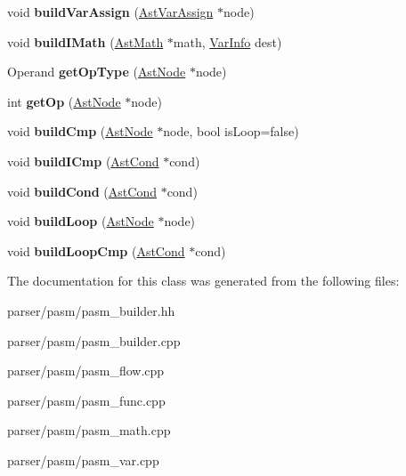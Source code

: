 \begin{DoxyCompactItemize}
\item 
\mbox{\label{classPasmBuilder_af85a036d1002cc982d8f5f9110874723}} 
void {\bfseries build\+Var\+Assign} (\hyperlink{classAstVarAssign}{Ast\+Var\+Assign} $\ast$node)
\item 
\mbox{\label{classPasmBuilder_a3f5427d54f868e12b599144322ceda54}} 
void {\bfseries build\+I\+Math} (\hyperlink{classAstMath}{Ast\+Math} $\ast$math, \hyperlink{structVarInfo}{Var\+Info} dest)
\item 
\mbox{\label{classPasmBuilder_acce80b42508ef12b964707da5a8e42f6}} 
Operand {\bfseries get\+Op\+Type} (\hyperlink{classAstNode}{Ast\+Node} $\ast$node)
\item 
\mbox{\label{classPasmBuilder_a7c14456727bec33c7830a00ca793c7cc}} 
int {\bfseries get\+Op} (\hyperlink{classAstNode}{Ast\+Node} $\ast$node)
\item 
\mbox{\label{classPasmBuilder_a7b7f3988c46f708dace0c9891b80f1c0}} 
void {\bfseries build\+Cmp} (\hyperlink{classAstNode}{Ast\+Node} $\ast$node, bool is\+Loop=false)
\item 
\mbox{\label{classPasmBuilder_a4ad6d08a9fd145020e8efe1f7623bc03}} 
void {\bfseries build\+I\+Cmp} (\hyperlink{classAstCond}{Ast\+Cond} $\ast$cond)
\item 
\mbox{\label{classPasmBuilder_a59d20a39e0eaa7581981830518ce1ad4}} 
void {\bfseries build\+Cond} (\hyperlink{classAstCond}{Ast\+Cond} $\ast$cond)
\item 
\mbox{\label{classPasmBuilder_a8f2ddcf13b863b48aaf3e604990b6705}} 
void {\bfseries build\+Loop} (\hyperlink{classAstNode}{Ast\+Node} $\ast$node)
\item 
\mbox{\label{classPasmBuilder_ab4c48a8292c77e8d00019d1c8b5c05c5}} 
void {\bfseries build\+Loop\+Cmp} (\hyperlink{classAstCond}{Ast\+Cond} $\ast$cond)
\end{DoxyCompactItemize}


The documentation for this class was generated from the following files\+:\begin{DoxyCompactItemize}
\item 
parser/pasm/pasm\+\_\+builder.\+hh\item 
parser/pasm/pasm\+\_\+builder.\+cpp\item 
parser/pasm/pasm\+\_\+flow.\+cpp\item 
parser/pasm/pasm\+\_\+func.\+cpp\item 
parser/pasm/pasm\+\_\+math.\+cpp\item 
parser/pasm/pasm\+\_\+var.\+cpp\end{DoxyCompactItemize}
